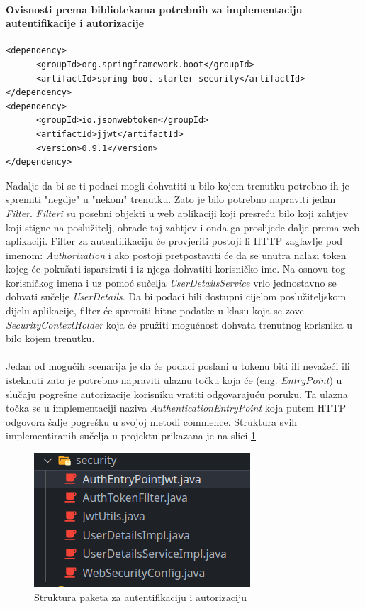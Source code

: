 \documentclass[times, utf8, zavrsni]{fer}
\begin{document}
\paragraph{Ovisnosti prema bibliotekama potrebnih za implementaciju autentifikacije i autorizacije}
\label{Security dependency}
\begin{Verbatim}[fontsize=\scriptsize]
<dependency>
      <groupId>org.springframework.boot</groupId>
      <artifactId>spring-boot-starter-security</artifactId>
</dependency>
<dependency>
      <groupId>io.jsonwebtoken</groupId>
      <artifactId>jjwt</artifactId>
      <version>0.9.1</version>
</dependency>
\end{Verbatim}
Nadalje da bi se ti podaci mogli dohvatiti u bilo kojem trenutku potrebno ih je spremiti "negdje" u "nekom" trenutku.
Zato je bilo potrebno napraviti jedan \textit{Filter}. \textit{Filteri} su posebni objekti u web aplikaciji koji presreću bilo koji
zahtjev koji stigne na poslužitelj, obrade taj zahtjev i onda ga proslijede dalje prema web aplikaciji.
Filter za autentifikaciju će provjeriti postoji li HTTP zaglavlje pod imenom: \textit{Authorization} i ako
postoji pretpostaviti će da se unutra nalazi token kojeg će pokušati isparsirati i iz njega dohvatiti korisničko ime.
Na osnovu tog korisničkog imena i uz pomoć sučelja \textit{UserDetailsService} vrlo jednostavno se dohvati sučelje \textit{UserDetails}.
Da bi podaci bili dostupni cijelom poslužiteljskom dijelu aplikacije, filter će spremiti bitne podatke u klasu koja se zove
\textit{SecurityContextHolder} koja će pružiti mogućnost dohvata trenutnog
korisnika u bilo kojem trenutku.
\\\\
Jedan od mogućih scenarija je da će podaci poslani u tokenu biti ili nevažeći ili isteknuti zato je potrebno napraviti
ulaznu točku koja će (eng. \textit{EntryPoint}) u slučaju pogrešne autorizacije korisniku vratiti odgovarajuću poruku. Ta
ulazna točka
se u implementaciji naziva \textit{AuthenticationEntryPoint} koja putem HTTP odgovora šalje pogrešku u svojoj metodi commence. Struktura
svih implementiranih sučelja u projektu prikazana je na slici \ref{fig:Security}

\begin{figure}[h]
      \centering
      \includegraphics[width=.5\textwidth]{security_implementation.png}
      \caption{Struktura paketa za autentifikaciju i autorizaciju}
      \label{fig:Security}
\end{figure}
\end{document}
